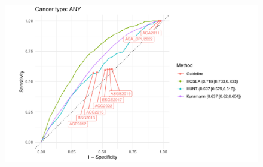 \documentclass[12pt]{article}
\begin{document}
\begin{figure}[h]
\centering
\includegraphics[width=1.0\textwidth]{figures/comparison_ANY.pdf}
\end{figure}
\end{document}
